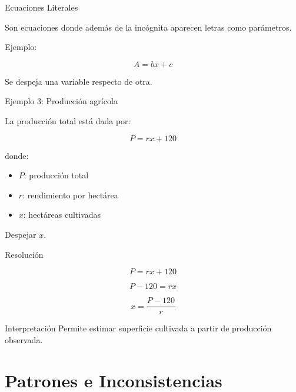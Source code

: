 \documentclass[handout,aspectratio=169]{beamer}
\begin{document}
	\begin{frame}{Ecuaciones Literales}
		
		Son ecuaciones donde además de la incógnita aparecen letras
		como parámetros.
		
		Ejemplo:
		
		\[
		A = bx + c
		\]
		
		Se despeja una variable respecto de otra.
		
	\end{frame}
	
	\begin{frame}{Ejemplo 3: Producción agrícola}
		
		La producción total está dada por:
		
		\[
		P = rx + 120
		\]
		
		donde:
		
		\begin{itemize}
			\item \(P\): producción total
			\item \(r\): rendimiento por hectárea
			\item \(x\): hectáreas cultivadas
		\end{itemize}
		
		Despejar \(x\).
		
	\end{frame}
	
	\begin{frame}{Resolución}
		
		\[
		P = rx + 120
		\]
		
		\pause
		
		\[
		P - 120 = rx
		\]
		
		\pause
		
		\[
		x = \frac{P-120}{r}
		\]
		
		\begin{block}{Interpretación}
			Permite estimar superficie cultivada
			a partir de producción observada.
		\end{block}
		
	\end{frame}
	
	\section{Patrones e Inconsistencias}
	
\end{document}
